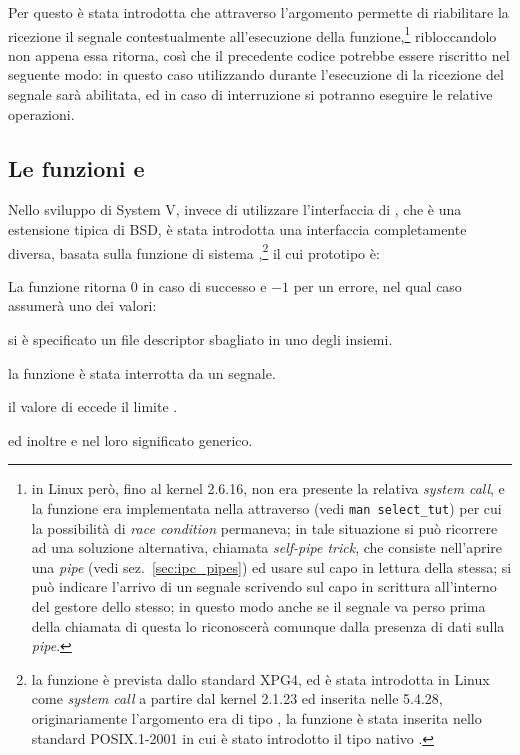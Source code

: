 Per questo è stata introdotta  che attraverso l'argomento
 permette di riabilitare la ricezione il segnale
contestualmente all'esecuzione della funzione,\footnote{in Linux però, fino al
  kernel 2.6.16, non era presente la relativa \textit{system call}, e la
  funzione era implementata nella  attraverso  (vedi
  \texttt{man select\_tut}) per cui la possibilità di \textit{race condition}
  permaneva; in tale situazione si può ricorrere ad una soluzione alternativa,
  chiamata  \textit{self-pipe trick}, che consiste
  nell'aprire una \textit{pipe} (vedi sez.~\ref{sec:ipc_pipes}) ed usare
   sul capo in lettura della stessa; si può indicare l'arrivo di
  un segnale scrivendo sul capo in scrittura all'interno del gestore dello
  stesso; in questo modo anche se il segnale va perso prima della chiamata di
   questa lo riconoscerà comunque dalla presenza di dati sulla
  \textit{pipe}.} ribloccandolo non appena essa ritorna, così che il
precedente codice potrebbe essere riscritto nel seguente modo:
in questo caso utilizzando  durante l'esecuzione di
 la ricezione del segnale sarà abilitata, ed in caso di
interruzione si potranno eseguire le relative operazioni.


\subsection{Le funzioni  e }
\label{sec:file_poll}

Nello sviluppo di System V, invece di utilizzare l'interfaccia di
, che è una estensione tipica di BSD, è stata introdotta una
interfaccia completamente diversa, basata sulla funzione di sistema
,\footnote{la funzione è prevista dallo standard XPG4, ed è stata
  introdotta in Linux come \textit{system call} a partire dal kernel 2.1.23 ed
  inserita nelle  5.4.28, originariamente l'argomento 
  era di tipo , la funzione è stata inserita nello standard
  POSIX.1-2001 in cui è stato introdotto il tipo nativo .} il
cui prototipo è:

\begin{funcproto}{
}

{La funzione ritorna $0$ in caso di successo e $-1$ per un errore, nel qual
  caso  assumerà uno dei valori: 
  \begin{errlist}
  \item[\errcode{EBADF}] si è specificato un file descriptor sbagliato in uno
    degli insiemi.
  \item[\errcode{EINTR}] la funzione è stata interrotta da un segnale.
  \item[\errcode{EINVAL}] il valore di  eccede il limite
    .
  \end{errlist}
  ed inoltre  e  nel loro significato generico.}
\end{funcproto}

